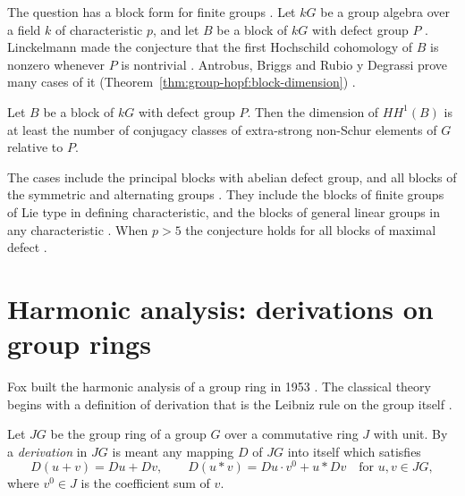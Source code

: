 The question has a block form for finite groups
\cite[p.~2]{AntrobusBriggsRubioDegrassi2026}. Let $kG$ be a group algebra over
a field $k$ of characteristic $p$, and let $B$ be a block of $kG$ with defect
group $P$ \cite[p.~2]{AntrobusBriggsRubioDegrassi2026}. Linckelmann made the
conjecture that the first Hochschild cohomology of $B$ is nonzero whenever $P$
is nontrivial \cite[Conjecture, p.~2]{AntrobusBriggsRubioDegrassi2026}.
Antrobus, Briggs and Rubio y Degrassi prove many cases of it
(Theorem~\ref{thm:group-hopf:block-dimension}) \cite[Theorem~B,
p.~2]{AntrobusBriggsRubioDegrassi2026}.\begin{theorem}\label{thm:group-hopf:block-dimension}
Let $B$ be a block of $kG$ with defect group $P$. Then the dimension of
$HH^{1}(B)$ is at least the number of conjugacy classes of extra-strong
non-Schur elements of $G$ relative to $P$. \end{theorem}

The cases include the principal blocks with abelian defect group, and all
blocks of the symmetric and alternating groups \cite[Theorem~B,
p.~2]{AntrobusBriggsRubioDegrassi2026}. They include the blocks of finite
groups of Lie type in defining characteristic, and the blocks of general
linear groups in any characteristic \cite[Theorem~B,
p.~2]{AntrobusBriggsRubioDegrassi2026}. When $p>5$ the conjecture holds for
all blocks of maximal defect \cite[Theorem~C,
p.~3]{AntrobusBriggsRubioDegrassi2026}.

\section{Harmonic analysis: derivations on group rings}\label{sec:group-hopf:harmonic-analysis}

Fox built the harmonic analysis of a group ring in 1953 \cite{Fox1953}. The
classical theory begins with a definition of derivation that is the Leibniz
rule on the group itself
\cite[equations (1.1)--(1.2), p.~549]{Fox1953}.

\begin{definition}\label{def:group-hopf:fox-derivation}
Let $JG$ be the group ring of a group $G$ over a commutative ring $J$ with
unit. By a \emph{derivation} in $JG$ is meant any mapping $D$ of $JG$ into
itself which satisfies
\[
D(u+v)=Du+Dv,\qquad D(u\ast v)=Du\cdot v^{0}+u\ast Dv\quad\text{for }u,v\in JG,
\]
where $v^{0}\in J$ is the coefficient sum of $v$.
\end{definition}

